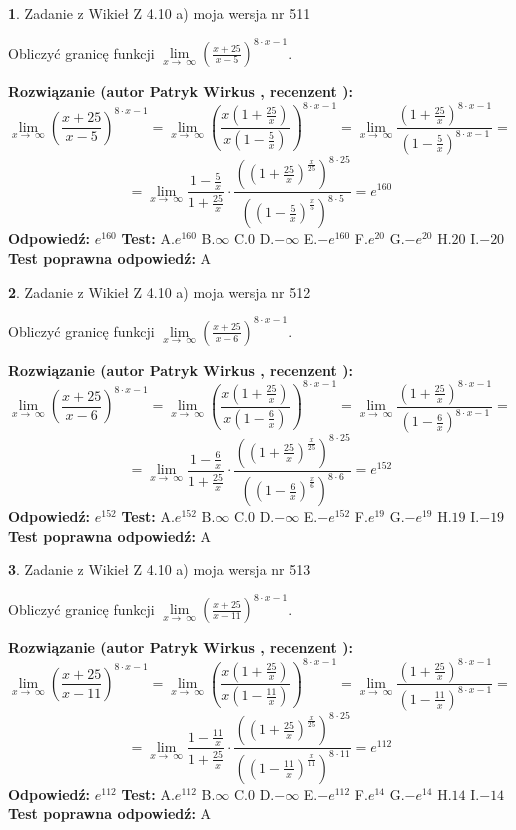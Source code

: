 \documentclass[12pt, a4paper]{article}
\theoremstyle{definition} %
\newtheorem{zad}{}
\newcommand{\zadStart}[1]{\begin{zad}#1\newline}
\newcommand{\zadStop}{\end{zad}}
\newcommand{\rozwStart}[2]{\noindent \textbf{Rozwiązanie (autor #1 , recenzent #2): }\newline}
\newcommand{\rozwStop}{\newline}
\newcommand{\odpStart}{\noindent \textbf{Odpowiedź:}\newline}
\newcommand{\odpStop}{\newline}
\newcommand{\testStart}{\noindent \textbf{Test:}\newline}
\newcommand{\testStop}{\newline}
\newcommand{\kluczStart}{\noindent \textbf{Test poprawna odpowiedź:}\newline}
\newcommand{\kluczStop}{\newline}
\begin{document}
\zadStart{Zadanie z Wikieł Z 4.10 a) moja wersja nr 511}

Obliczyć granicę funkcji  $\lim\limits_{x\to\ \infty}(\frac{x+25}{x-5})^{8\cdot x-1}$.
\zadStop
\rozwStart{Patryk Wirkus}{}
$$\lim\limits_{x\to\ \infty}(\frac{x+25}{x-5})^{8\cdot x-1} = \lim\limits_{x\to\ \infty}(\frac{x(1+\frac{25}{x})}{x(1-\frac{5}{x})})^{8\cdot x-1}=\lim\limits_{x\to\ \infty}\frac{(1+\frac{25}{x})^{8\cdot x-1}}{(1-\frac{5}{x})^{8\cdot x-1}}=$$
$$=\lim\limits_{x\to\ \infty}\frac{1-\frac{5}{x}}{1+\frac{25}{x}}\cdot\frac{((1+\frac{25}{x})^{\frac{x}{25}})^{8\cdot25}}{((1-\frac{5}{x})^{\frac{x}{5}})^{8\cdot5}}=e^{160}$$
\rozwStop
\odpStart
$e^{160}$
\odpStop
\testStart
A.$e^{160}$ B.$\infty$ C.$0$ D.$-\infty$ E.$-e^{160}$
F.$e^{20}$ G.$-e^{20}$
H.$20$
I.$-20$
\testStop
\kluczStart
A
\kluczStop



\zadStart{Zadanie z Wikieł Z 4.10 a) moja wersja nr 512}

Obliczyć granicę funkcji  $\lim\limits_{x\to\ \infty}(\frac{x+25}{x-6})^{8\cdot x-1}$.
\zadStop
\rozwStart{Patryk Wirkus}{}
$$\lim\limits_{x\to\ \infty}(\frac{x+25}{x-6})^{8\cdot x-1} = \lim\limits_{x\to\ \infty}(\frac{x(1+\frac{25}{x})}{x(1-\frac{6}{x})})^{8\cdot x-1}=\lim\limits_{x\to\ \infty}\frac{(1+\frac{25}{x})^{8\cdot x-1}}{(1-\frac{6}{x})^{8\cdot x-1}}=$$
$$=\lim\limits_{x\to\ \infty}\frac{1-\frac{6}{x}}{1+\frac{25}{x}}\cdot\frac{((1+\frac{25}{x})^{\frac{x}{25}})^{8\cdot25}}{((1-\frac{6}{x})^{\frac{x}{6}})^{8\cdot6}}=e^{152}$$
\rozwStop
\odpStart
$e^{152}$
\odpStop
\testStart
A.$e^{152}$ B.$\infty$ C.$0$ D.$-\infty$ E.$-e^{152}$
F.$e^{19}$ G.$-e^{19}$
H.$19$
I.$-19$
\testStop
\kluczStart
A
\kluczStop



\zadStart{Zadanie z Wikieł Z 4.10 a) moja wersja nr 513}

Obliczyć granicę funkcji  $\lim\limits_{x\to\ \infty}(\frac{x+25}{x-11})^{8\cdot x-1}$.
\zadStop
\rozwStart{Patryk Wirkus}{}
$$\lim\limits_{x\to\ \infty}(\frac{x+25}{x-11})^{8\cdot x-1} = \lim\limits_{x\to\ \infty}(\frac{x(1+\frac{25}{x})}{x(1-\frac{11}{x})})^{8\cdot x-1}=\lim\limits_{x\to\ \infty}\frac{(1+\frac{25}{x})^{8\cdot x-1}}{(1-\frac{11}{x})^{8\cdot x-1}}=$$
$$=\lim\limits_{x\to\ \infty}\frac{1-\frac{11}{x}}{1+\frac{25}{x}}\cdot\frac{((1+\frac{25}{x})^{\frac{x}{25}})^{8\cdot25}}{((1-\frac{11}{x})^{\frac{x}{11}})^{8\cdot11}}=e^{112}$$
\rozwStop
\odpStart
$e^{112}$
\odpStop
\testStart
A.$e^{112}$ B.$\infty$ C.$0$ D.$-\infty$ E.$-e^{112}$
F.$e^{14}$ G.$-e^{14}$
H.$14$
I.$-14$
\testStop
\kluczStart
A
\kluczStop
\end{document}
